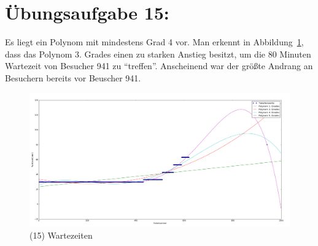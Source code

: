 

	\section*{Übungsaufgabe 15:}

	Es liegt ein Polynom mit mindestens Grad 4 vor. Man erkennt in Abbildung~\ref{fig:wartezeiten}, dass das Polynom 3. Grades einen zu starken Anstieg
	besitzt, um die 80 Minuten Wartezeit von Besucher 941 zu ``treffen''. Anscheinend war der größte Andrang an Besuchern bereits vor Beuscher 941.

	\begin{figure}
        \includegraphics[width=1.0\textwidth]{A15.png}
        \caption{(15) Wartezeiten}
        \label{fig:wartezeiten}
    \end{figure}
	
\newpage
